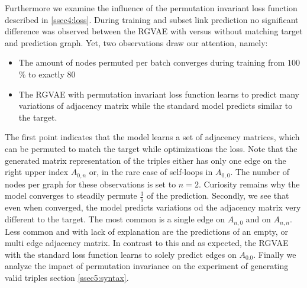 Furthermore we examine the influence of the permutation invariant loss function described in \ref{ssec4:loss}. During training and subset link prediction no significant difference was observed between the RGVAE with versus without matching target and prediction graph. Yet, two observations draw our attention, namely:

\begin{itemize}
  \item The amount of nodes permuted per batch converges during training from $100$\% to exactly $80$%
  \item The RGVAE with permutation invariant loss function learns to predict many variations of adjacency matrix while the standard model predicts similar to the target.
\end{itemize}

The first point indicates that the model learns a set of adjacency matrices, which can be permuted to match the target while optimizations the loss. Note that the generated matrix representation of the triples either has only one edge on the right upper index $A_{0,n}$ or, in the rare case of self-loops in $A_{0,0}$. The number of nodes per graph for these observations is set to $n=2$. Curiosity remains why the model converges to steadily permute $\frac{3}{5}$ of the prediction.
Secondly, we see that even when converged, the model predicts variations od the adjacency matrix very different to the target. The most common is a single edge on $A_{n,0}$ and on $A_{n,n}$. Less common and with lack of explanation are the predictions of an empty, or multi edge adjacency matrix. In contrast to this and as expected, the RGVAE with the standard loss function learns to solely predict edges on $A_{0.0}$. 
Finally we analyze the impact of permutation invariance on the experiment of generating valid triples section \ref{ssec5:syntax}.






